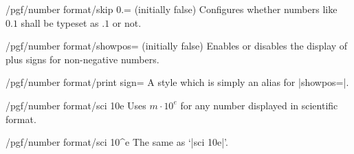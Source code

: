 \begin{key}{/pgf/number format/skip 0.= (initially false)}
  Configures whether numbers like $0.1$ shall be typeset as $.1$ or
  not. 
\begin{codeexample}[]
\end{codeexample}
\begin{codeexample}[]
\end{codeexample}
\end{key}

\begin{key}{/pgf/number format/showpos= (initially false)}
  Enables or disables the display of plus signs for non-negative
  numbers. 
\begin{codeexample}[]
\end{codeexample}

\begin{codeexample}[]
\end{codeexample}

\begin{codeexample}[]
\end{codeexample}
\end{key}

\begin{stylekey}{/pgf/number format/print sign=}
  A style which is simply an alias for |showpos=|. 
\end{stylekey}

\begin{key}{/pgf/number format/sci 10e}
  Uses $m \cdot 10^e$ for any number displayed in scientific format. 

\begin{codeexample}[]
\end{codeexample}
\end{key}

\begin{key}{/pgf/number format/sci 10\textasciicircum e}
  The same as `|sci 10e|'.
\end{key}

